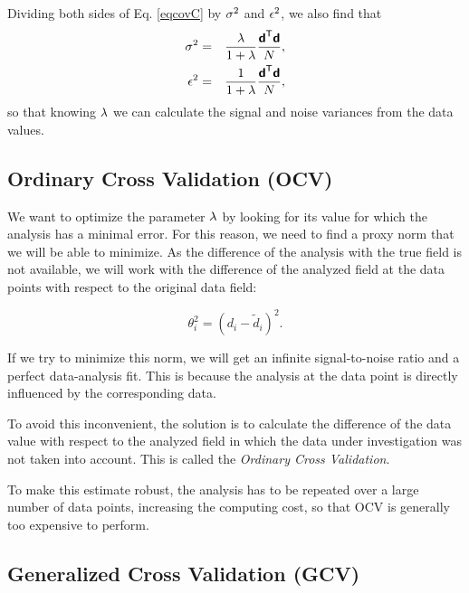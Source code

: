 Dividing both sides of Eq. \ref{eqcovC} by $\sigma^{2}$ and  $\epsilon^{2}$, we also find that
\begin{eqnarray}
\sigma^2 &=& \frac{\lambda}{1 + \lambda} \frac{ {\mbox{\boldmath $ \protect\mathsf{d} $}}^\mathsf{T} \mbox{\boldmath $ \protect\mathsf{d} $}}{N},\label{eq:signalsnr}\\
\epsilon^2 &=& \frac{1 }{ 1 + \lambda} \frac{ {\mbox{\boldmath $ \protect\mathsf{d} $}}^\mathsf{T} \mbox{\boldmath $ \protect\mathsf{d} $} }{ N},\label{eq:noisesnr}
\end{eqnarray}
so that knowing $\lambda$ we can calculate the signal and noise variances from the data values.


\subsection{Ordinary Cross Validation (OCV)}

We want to optimize the parameter $\lambda$ by looking for its value for which the analysis has a minimal error. For this reason, we need to find a proxy norm that we will be able to minimize. As the difference of the analysis with the true field is not available, we will work with the difference of the analyzed field at the data points with respect to the original data field:

\begin{equation}
{\theta_i^2} = {(d_i - \tilde{d}_i)^2}.
\end{equation}

If we try to minimize this norm, we will get an infinite signal-to-noise ratio and a perfect data-analysis fit. This is because the analysis at the data point is directly influenced by the corresponding data. 

To avoid this inconvenient, the solution is to calculate the difference of the data value with respect to the analyzed field in which the data under investigation was not taken into account. This is called the \textit{Ordinary Cross Validation}. 

To make this estimate robust, the analysis has to be repeated over a large number of data points, increasing the computing cost, so that OCV is generally too expensive to perform.


\subsection{Generalized Cross Validation (GCV)}

